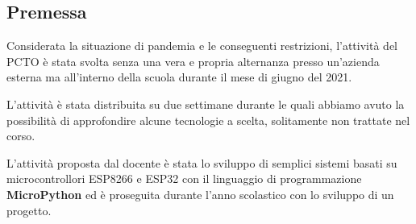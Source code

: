 \subsection{Premessa}
Considerata la situazione di pandemia e le conseguenti restrizioni, l'attività
del PCTO è stata svolta senza una vera e propria alternanza presso un'azienda
esterna ma all'interno della scuola durante il mese di giugno del 2021.

L'attività è stata distribuita su due settimane durante le quali abbiamo avuto
la possibilità di approfondire alcune tecnologie a scelta, solitamente
non trattate nel corso.

L'attività proposta dal docente è stata lo sviluppo di semplici sistemi basati
su microcontrollori ESP8266 e ESP32 con il linguaggio di programmazione
\textbf{MicroPython} ed è proseguita durante l'anno scolastico con lo
sviluppo di un progetto.